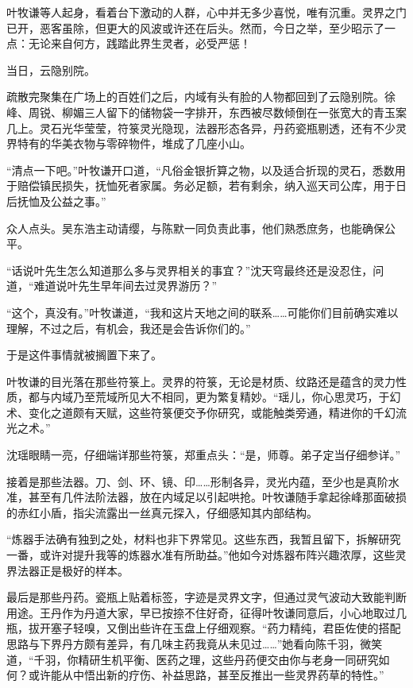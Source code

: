 叶牧谦等人起身，看着台下激动的人群，心中并无多少喜悦，唯有沉重。灵界之门已开，恶客虽除，但更大的风波或许还在后头。然而，今日之举，至少昭示了一点：无论来自何方，践踏此界生灵者，必受严惩！

\vspace{2em}

当日，云隐别院。

疏散完聚集在广场上的百姓们之后，内域有头有脸的人物都回到了云隐别院。徐峰、周锐、柳媚三人留下的储物袋一字排开，东西被尽数倾倒在一张宽大的青玉案几上。灵石光华莹莹，符箓灵光隐现，法器形态各异，丹药瓷瓶剔透，还有不少灵界特有的华美衣物与零碎物件，堆成了几座小山。

“清点一下吧。”叶牧谦开口道，“凡俗金银折算之物，以及适合折现的灵石，悉数用于赔偿镇民损失，抚恤死者家属。务必足额，若有剩余，纳入巡天司公库，用于日后抚恤及公益之事。”

众人点头。吴东浩主动请缨，与陈默一同负责此事，他们熟悉庶务，也能确保公平。

“话说叶先生怎么知道那么多与灵界相关的事宜？”沈天穹最终还是没忍住，问道，“难道说叶先生早年间去过灵界游历？”

“这个，真没有。”叶牧谦道，“我和这片天地之间的联系……可能你们目前确实难以理解，不过之后，有机会，我还是会告诉你们的。”

于是这件事情就被搁置下来了。

叶牧谦的目光落在那些符箓上。灵界的符箓，无论是材质、纹路还是蕴含的灵力性质，都与内域乃至荒域所见大不相同，更为繁复精妙。“瑶儿，你心思灵巧，于幻术、变化之道颇有天赋，这些符箓便交予你研究，或能触类旁通，精进你的千幻流光之术。”

沈瑶眼睛一亮，仔细端详那些符箓，郑重点头：“是，师尊。弟子定当仔细参详。”

接着是那些法器。刀、剑、环、镜、印……形制各异，灵光内蕴，至少也是真阶水准，甚至有几件法阶法器，放在内域足以引起哄抢。叶牧谦随手拿起徐峰那面破损的赤红小盾，指尖流露出一丝真元探入，仔细感知其内部结构。

“炼器手法确有独到之处，材料也非下界常见。这些东西，我暂且留下，拆解研究一番，或许对提升我等的炼器水准有所助益。”他如今对炼器布阵兴趣浓厚，这些灵界法器正是极好的样本。

最后是那些丹药。瓷瓶上贴着标签，字迹是灵界文字，但通过灵气波动大致能判断用途。王丹作为丹道大家，早已按捺不住好奇，征得叶牧谦同意后，小心地取过几瓶，拔开塞子轻嗅，又倒出些许在玉盘上仔细观察。“药力精纯，君臣佐使的搭配思路与下界丹方颇有差异，有几味主药我竟从未见过……”她看向陈千羽，微笑道，“千羽，你精研生机平衡、医药之理，这些丹药便交由你与老身一同研究如何？或许能从中悟出新的疗伤、补益思路，甚至反推出一些灵界药草的特性。”

